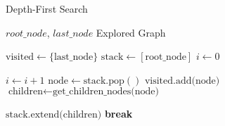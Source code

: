 \begin{algorithm}[H]
    \caption{Depth-First Search}
    \label{alg:dfs}
    \begin{algorithmic}[1]
        \REQUIRE $root\_node$, $last\_node$
        \ENSURE Explored Graph

        \STATE $\text{visited} \gets \{\text{last\_node}\}$ 
        \STATE $\text{stack} \gets [\text{root\_node}]$ 
        \STATE $i \gets 0$ 

        \STATE $i \gets i + 1$
        \STATE $\text{node} \gets \text{stack.pop}()$
        \STATE $\text{visited.add(node)}$
        \STATE $\text{children} \gets \text{get\_children\_nodes(node)}$

        \STATE $\text{stack.extend(children)}$ 
        \ENDIF
        \ENDIF
        \STATE \textbf{break} 
        \ENDIF
        \ENDWHILE
    \end{algorithmic}
\end{algorithm}

